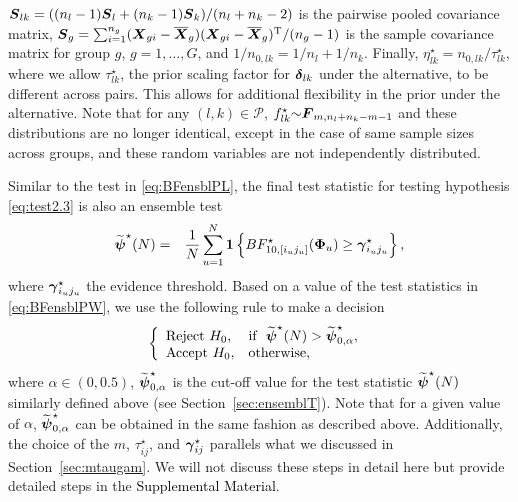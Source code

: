 \documentclass[pdflatex,sn-basic]{sn-jnl}%
\def\be{\begin{eqnarray}}
\def\ee{\end{eqnarray}}
\def\boldpsi{{\mbox{\boldmath $\psi$}}}
\def\trans{^{\rm T}}
\def\bone{{\mathbf 1}}
\newcommand{\uF}       {\mbox{\boldmath$F$}}
\newcommand{\uS}       {\mbox{\boldmath$S$}}
\newcommand{\uX}       {\mbox{\boldmath$X$}}
\newcommand{\ugamma}            {\mbox{\boldmath$\gamma$}}
\newcommand{\udelta}            {\mbox{\boldmath$\delta$}}
\newcommand{\uPhi}              {\mbox{\boldmath$\Phi$}}
\theoremstyle{thmstyleone}%
\theoremstyle{thmstyletwo}%
\theoremstyle{thmstylethree}%
\begin{document}
$\uS_{lk} = ((n_l-1)\uS_{l} + (n_k - 1)\uS_k)/(n_l +n_k -2)$ is the pairwise pooled covariance matrix, $\uS_g = \sum_{i = 1}^{n_g}(\uX_{gi} - \overline{\uX}_g)(\uX_{gi} - \overline{\uX}_g)\trans/(n_g - 1)$ is the sample covariance matrix for group $g$, $g = 1,\ldots,G$, and $1/n_{0,lk} = 1/n_l + 1/n_k$.
Finally, $\eta^{\star}_{lk} = n_{0,lk} /\tau^{\star}_{lk}$, where we allow $\tau^{\star}_{lk}$, the prior scaling factor for $\udelta_{lk}$ under the alternative, to be different across pairs. This allows for additional flexibility in the prior under the alternative.  
Note that for any $ (l,k) \in \mathcal{P}$, $f^{\star}_{lk}{\sim} \uF_{m, n_{l}+n_{k} - m- 1}$ and these distributions are no longer identical, except in the case of same sample sizes across groups, and these random variables are not independently distributed. 

Similar to the test in \eqref{eq:BFensblPL}, the final test statistic for testing hypothesis \eqref{eq:test2.3} is also an ensemble test 
\be
\widetilde{\boldpsi}^{\star}(N) &=& \frac{1}{N}\sum^{N}_{u=1} \bone \left\{ BF^{\star}_{10, [i_u j_u]}(\uPhi_u) \geq \ugamma^{\star}_{i_u j_u} \right\}, \label{eq:BFensblPW}
\ee
where $\ugamma^{\star}_{i_u j_u}$ the evidence threshold. 
Based on a value of the test statistics in \eqref{eq:BFensblPW}, we use the following rule to make a decision
\be
 \left \{
       \begin{array}{llll}
       \mbox{Reject}~ H_{0}, & \mbox{if} ~~ \widetilde{\boldpsi}^{\star}(N) > \widetilde{\boldpsi}^{\star}_{0, \alpha},  \\
       \mbox{Accept}~ H_{0}, & \mbox{otherwise}, \label{eq:ensembleTestPw}
       \end{array}
       \right. \;
\ee
where $\alpha \in (0, 0.5)$, $\widetilde{\boldpsi}^{\star}_{0, \alpha}$ is the cut-off value for the test statistic $\widetilde{\boldpsi}^{\star}(N)$ similarly defined above (see Section~\ref{sec:ensemblT}). Note that for a given value of $\alpha$, $\widetilde{\boldpsi}^{\star}_{0, \alpha}$ can be obtained in the same fashion as described above. Additionally, the choice of the $m$, $\tau^{\star}_{ij}$, and $\ugamma^{\star}_{ij}$ parallels what we discussed in Section~\ref{sec:mtaugam}. We will not discuss these steps in detail here but provide detailed steps in the \textcolor{black}{Supplemental Material}.    
\end{document}
